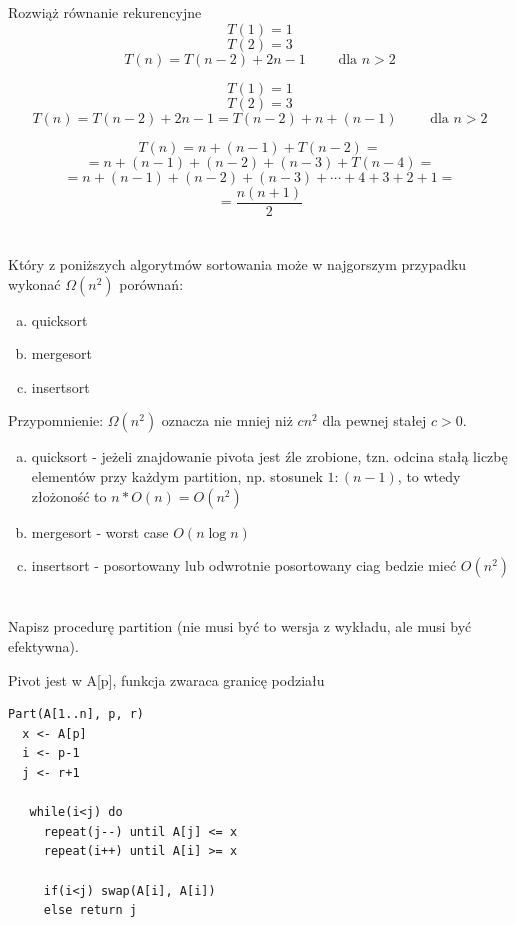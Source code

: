 \documentclass[svgnames]{report}
\begin{document}
\section{}
\begin{framed}
Rozwiąż równanie rekurencyjne
$$ T(1)=1$$
$$ T(2)=3$$
$$ T(n)=T(n-2)+2n-1 \qquad \mbox{ dla $n >2$} $$
\end{framed}
$$ T(1)=1$$
$$ T(2)=3$$
$$ T(n)=T(n-2)+2n-1=T(n-2)+n+(n-1) \qquad \mbox{ dla $n >2$} $$

$$ T(n)=n+(n-1)+T(n-2)=$$
$$ = n+(n-1)+(n-2)+(n-3)+T(n-4)=$$
$$ = n+(n-1)+(n-2)+(n-3)+\cdots+4+3+2+1=$$
$$= \frac {n(n+1)} 2$$

\section{}
\begin{framed}
Który z poniższych algorytmów sortowania może w najgorszym przypadku wykonać $\Omega(n^2)$ porównań:
\begin{enumerate}[a)]
	\item quicksort
	\item mergesort
	\item insertsort
\end{enumerate}
Przypomnienie: $\Omega(n^2)$ oznacza nie mniej niż $cn^2$ dla pewnej stałej $c>0$.
\end{framed}
\begin{enumerate}[a)]
	\item quicksort - jeżeli znajdowanie pivota jest źle zrobione, tzn. odcina stałą liczbę elementów przy każdym partition, np. stosunek $1:(n-1)$, to wtedy złożoność to $n*O(n) = O(n^2)$
	\item mergesort - worst case $O(n\log n)$
	\item insertsort - posortowany lub odwrotnie posortowany ciag bedzie mieć $O(n^2)$
\end{enumerate}

\section{}
\begin{framed}
Napisz procedurę partition (nie musi być to wersja z wykładu, ale musi być efektywna).
\end{framed}
Pivot jest w A[p], funkcja zwaraca granicę podziału
\begin{lstlisting}
Part(A[1..n], p, r)
  x <- A[p] 
  i <- p-1 
  j <- r+1
  
   while(i<j) do
     repeat(j--) until A[j] <= x
     repeat(i++) until A[i] >= x
    
     if(i<j) swap(A[i], A[i])
     else return j 
\end{lstlisting}
\end{document}
